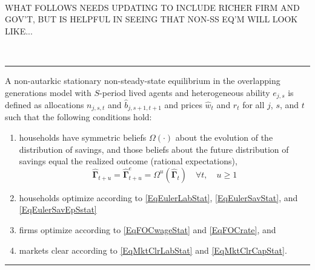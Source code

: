 \ \\ 
WHAT FOLLOWS NEEDS UPDATING TO INCLUDE RICHER FIRM AND GOV'T, BUT IS HELPFUL IN SEEING THAT NON-SS EQ'M WILL LOOK LIKE...

\ \\

    \hrule
    \begin{definition}\label{DefEquilNonSS}
      A non-autarkic stationary non-steady-state equilibrium in the overlapping generations model with $S$-period lived agents and heterogeneous ability $e_{j,s}$ is defined as allocations $n_{j,s,t}$ and $\hat{b}_{j,s+1,t+1}$ and prices $\hat{w}_t$ and $r_t$ for all $j$, $s$, and $t$ such that the following conditions hold:
       \begin{enumerate}
          \item households have symmetric beliefs $\Omega(\cdot)$ about the evolution of the distribution of savings, and those beliefs about the future distribution of savings equal the realized outcome (rational expectations),
            \begin{equation*}
              \bm{\hat{\Gamma}}_{t+u} = \bm{\hat{\Gamma}}^e_{t+u} = \Omega^u\left( \bm{\hat{\Gamma}}_t\right) \quad\forall t, \quad u\geq 1
            \end{equation*}
          \item households optimize according to \eqref{EqEulerLabStat}, \eqref{EqEulerSavStat}, and \eqref{EqEulerSavEpSstat}
          \item firms optimize according to \eqref{EqFOCwageStat} and \eqref{EqFOCrate}, and
          \item markets clear according to \eqref{EqMktClrLabStat} and \eqref{EqMktClrCapStat}.
       \end{enumerate}
    \end{definition}
    \hrule
   
   \ \\
   
